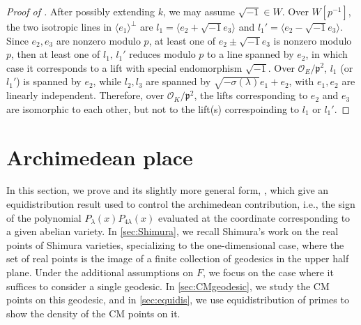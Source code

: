 \documentclass{amsart}
\numberwithin{equation}{subsection}
\numberwithin{theorem}{section}
\theoremstyle{definition}
\theoremstyle{remark}
\begin{document}
\begin{proof}[Proof of ]
     After possibly extending $k$, we may assume $\sqrt{-1}\in W$. Over $W[p^{-1}]$, the two isotropic lines in $\langle e_1\rangle^{\perp}$ are $l_1 = \langle e_2 + \sqrt{-1} e_3\rangle$ and $l_1' = \langle  e_2 - \sqrt{-1} e_3\rangle$. Since $e_2, e_3$ are nonzero modulo $p$, at least one of $e_2 \pm \sqrt{-1} e_3$ is nonzero modulo $p$, then at least one of $l_1, \, l_1'$ reduces modulo $p$ to a line spanned by $e_2$, in which case it corresponds to a lift with special endomorphism $\sqrt{-1}$. 
     Over $\mathcal{O}_E/\mathfrak{p}^2$, $l_1$ (or $l_1'$) is spanned by $e_2$, while $l_2, l_3$ are spanned by $\sqrt{-\sigma(\lambda)} e_1 +  e_2$, with $e_1, e_2$ are linearly independent. Therefore, over $\mathcal{O}_K/ \mathfrak{p}^2$, the lifts corresponding to $e_2$ and $e_3$ are isomorphic to each other, but not to the lift(s) correspoinding to $l_1$ or $l_1'$. 
\end{proof}
 


\section{Archimedean place}\label{sec:arch}

In this section, we prove  and its slightly more general form, , which give an equidistribution result used to control the archimedean contribution, i.e., the sign of the polynomial $P_{\lambda}(x)P_{4\lambda}(x)$ evaluated at the coordinate corresponding to a given abelian variety. In \cref{sec:Shimura}, we recall Shimura's work on the real points of Shimura varieties, specializing to the one-dimensional case, where the set of real points is the image of a finite collection of geodesics in the upper half plane. 
Under the additional assumptions on $F$, we focus on the case where it suffices to consider a single geodesic. In \cref{sec:CMgeodesic}, we study the CM points on this geodesic, and in \cref{sec:equidis}, we use equidistribution of primes to show the density of the CM points on it. 
\end{document}
